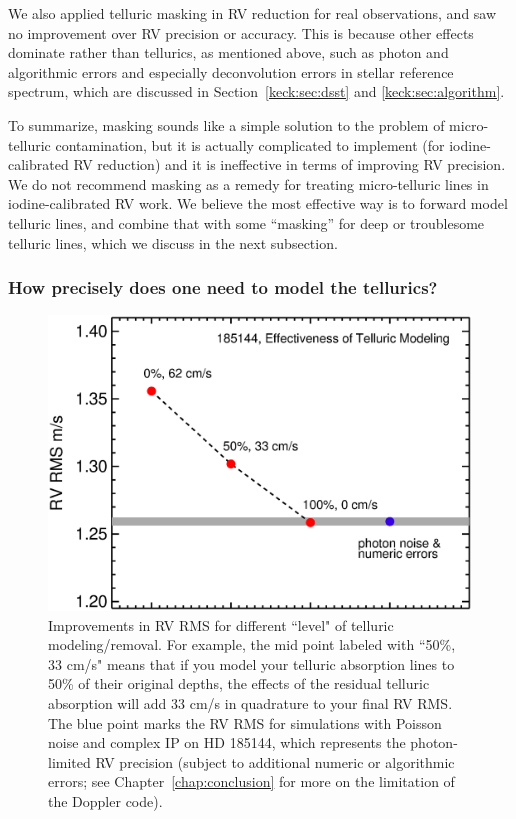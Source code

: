 We also applied telluric masking in RV reduction for real
observations, and saw no improvement over RV precision or
accuracy. This is because other effects dominate rather than
tellurics, as mentioned above, such as photon and algorithmic errors
and especially deconvolution errors in stellar reference spectrum,
which are discussed in Section~\ref{keck:sec:dsst} and
\ref{keck:sec:algorithm}.

To summarize, masking sounds like a simple solution to the problem of
micro-telluric contamination, but it is actually complicated to
implement (for iodine-calibrated RV reduction) and it is ineffective
in terms of improving RV precision. We do not recommend masking as a
remedy for treating micro-telluric lines in iodine-calibrated RV
work. We believe the most effective way is to forward model telluric
lines, and combine that with some ``masking'' for deep or troublesome
telluric lines, which we discuss in the next subsection.

\subsubsection{How precisely does one need to model the tellurics?}


\begin{figure}
\includegraphics[scale=0.5]{telluric/neid.eps} 
\caption{Improvements in RV RMS for different ``level" of telluric
  modeling/removal. For example, the mid point labeled with ``50\%, 33 cm/s"
  means that if you model your telluric absorption lines to 50\% of
  their original depths, the effects of the residual telluric
  absorption will add 33 cm/s in quadrature to your final RV RMS. The
  blue point marks the RV RMS for simulations with Poisson noise and
  complex IP on HD 185144, which represents the photon-limited RV
  precision (subject to additional numeric or algorithmic errors; see
  Chapter~\ref{chap:conclusion} for more on the limitation of the
  Doppler code).
\label{telluric:fig:neid}}
\end{figure}


